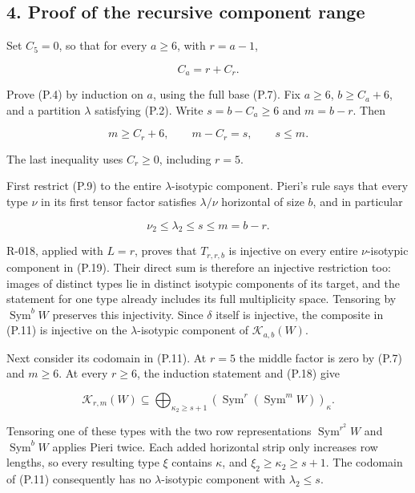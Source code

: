\documentclass[
  10pt,
]{article}
\begin{document}
\subsection{4. Proof of the recursive component
range}\label{proof-of-the-recursive-component-range}

Set \(C_5=0\), so that for every \(a\ge6\), with \(r=a-1\),

\[
C_a=r+C_r.
\tag{P.17}
\]

Prove (P.4) by induction on \(a\), using the full base (P.7). Fix
\(a\ge6\), \(b\ge C_a+6\), and a partition \(\lambda\) satisfying (P.2).
Write \(s=b-C_a\ge6\) and \(m=b-r\). Then

\[
m\ge C_r+6,\qquad m-C_r=s,\qquad s\le m.
\tag{P.18}
\]

The last inequality uses \(C_r\ge0\), including \(r=5\).

First restrict (P.9) to the entire \(\lambda\)-isotypic component.
Pieri's rule says that every type \(\nu\) in its first tensor factor
satisfies \(\lambda/\nu\) horizontal of size \(b\), and in particular

\[
\nu_2\le\lambda_2\le s\le m=b-r.
\tag{P.19}
\]

R-018, applied with \(L=r\), proves that \(T_{r,r,b}\) is injective on
every entire \(\nu\)-isotypic component in (P.19). Their direct sum is
therefore an injective restriction too: images of distinct types lie in
distinct isotypic components of its target, and the statement for one
type already includes its full multiplicity space. Tensoring by
\(\operatorname{Sym}^{b}W\) preserves this injectivity. Since \(\delta\)
itself is injective, the composite in (P.11) is injective on the
\(\lambda\)-isotypic component of \(\mathcal K_{a,b}(W)\).

Next consider its codomain in (P.11). At \(r=5\) the middle factor is
zero by (P.7) and \(m\ge6\). At every \(r\ge6\), the induction statement
and (P.18) give

\[
\mathcal K_{r,m}(W)
\subseteq
\bigoplus_{\kappa_2\ge s+1}
\left(\operatorname{Sym}^{r}(\operatorname{Sym}^{m}W)\right)_\kappa.
\tag{P.20}
\]

Tensoring one of these types with the two row representations
\(\operatorname{Sym}^{r^2}W\) and \(\operatorname{Sym}^{b}W\) applies
Pieri twice. Each added horizontal strip only increases row lengths, so
every resulting type \(\xi\) contains \(\kappa\), and
\(\xi_2\ge\kappa_2\ge s+1\). The codomain of (P.11) consequently has no
\(\lambda\)-isotypic component with \(\lambda_2\le s\).
\end{document}

